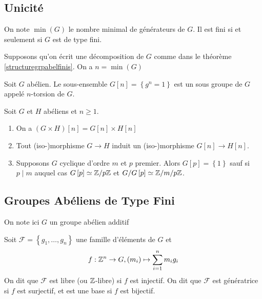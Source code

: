 \documentclass{cours}
\begin{document}
\subsection{Unicité}
\begin{definition}
    On note $\min(G)$ le nombre minimal de générateurs de $G$. Il est fini si et seulement si $G$ est de type fini.
\end{definition}
\begin{proposition}
    Supposons qu'on écrit une décomposition de $G$ comme dans le théorème \ref{structuregrpabelfinis}. On a $n = \min{(G)}$
\end{proposition}

\begin{definition}
    Soit $G$ abélien. Le sous-ensemble $G\left[n\right] = \left\{g^{n} = 1\right\}$ est un sous groupe de $G$ appelé $n$-torsion de $G$.
\end{definition}

\begin{lemma}
    Soit $G$ et $H$ abéliens et $n \geq 1$.
    \begin{enumerate}
        \item On a $\left(G \times H\right)\left[n\right] = G\left[n\right] \times H\left[n\right]$
        \item Tout (iso-)morphisme $G \rightarrow H$ induit un (iso-)morphisme $G\left[n\right] \rightarrow H\left[n\right]$.
        \item Supposons $G$ cyclique d'ordre $m$ et $p$ premier. Alors $G\left[p\right] = \left\{1\right\}$ sauf si $p \mid m$ auquel cas $G\left[p\right] \simeq \mathbb{Z}/p\mathbb{Z}$ et $G/G\left[p\right] \simeq \mathbb{Z}/m/p\mathbb{Z}$.
    \end{enumerate}
\end{lemma}

\subsection{Groupes Abéliens de Type Fini}
On note ici $G$ un groupe abélien additif

\begin{definition}
    Soit $\mathcal{F} = \left\{g_{1},\ldots, g_{n}\right\}$ une famille d'éléments de $G$ et
    \[
        f : \mathbb{Z}^{n} \rightarrow G, (m_{i}) \mapsto \sum_{i = 1}^{n}m_{i}g_{i}
    \]
    On dit que $\mathcal{F}$ est libre (ou $\mathbb{Z}$-libre) si $f$ est injectif. On dit que $\mathcal{F}$ est génératrice si $f$ est surjectif, et est une base si $f$ est bijectif.
\end{definition}
\end{document}

